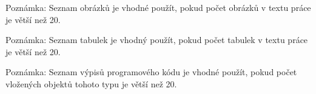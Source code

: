 \documentclass[11pt,a4paper]{report}
\let\openright=\clearpage
\begin{document}


\setcounter{tocdepth}{2}
\tableofcontents

\openright
\listoffigures
Poznámka: Seznam obrázků je vhodné použít, pokud počet obrázků v textu práce je větší než 20.

\clearpage
\listoftables
Poznámka: Seznam tabulek je vhodný použít, pokud počet tabulek v textu práce je větší než 20.

\clearpage
\lstlistoflistings
Poznámka: Seznam výpisů programového kódu je vhodné použít, pokud počet vložených objektů tohoto typu je větší než 20. 



\pagestyle{fancyx}
{%
\pagestyle{plain}


}
% 
% 
% 






{%
\pagestyle{plain}

}



\part*{\Prilohy\thispagestyle{empty}}
\appendix


% 
% 
\end{document}
